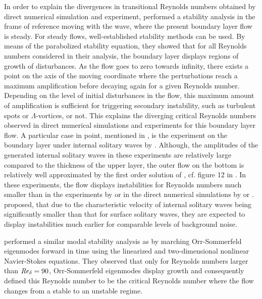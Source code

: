 \documentclass{jfm}
\newcommand\Rey{\mbox{\textit{Re}}}  %
\begin{document}
In order to 
explain the divergences in transitional Reynolds numbers obtained
by direct numerical simulation and experiment, 
\citet{VerschaevePedersen2014} 
performed a stability analysis in the frame of reference
moving with the wave, where the present boundary layer flow is steady. 
For steady flows,
well-established stability methods can be used. By means of the
parabolized stability equation, they showed that
for all Reynolds numbers considered in their analysis, the boundary
layer
displays regions of growth of disturbances. As the flow goes to
zero towards infinity, there exists a point
on the axis of the moving coordinate
where the perturbations reach a maximum amplification
before decaying again for a given Reynolds number. Depending
on the level of initial disturbances in the flow, 
this maximum amount of amplification is sufficient for triggering
secondary instability, such as turbulent spots or $ \Lambda $-vortices,
or not. This explains the diverging
critical Reynolds numbers observed in direct numerical
simulations and experiments for this boundary layer flow.
A particular case in point, mentioned in \cite{VerschaevePedersen2014},
is the experiment on the boundary layer under internal
solitary waves by \cite{CarrDavies2006}.
Although, the amplitudes of the generated internal
solitary waves in these experiments are relatively large
compared to the thickness of the upper layer, the outer
flow on the bottom is relatively well approximated by the
first order solution of \citet{Benjamin1966}, cf. figure 12 in \cite{CarrDavies2006}. 
In these
experiments, the flow displays instabilities for
Reynolds numbers much smaller than in the experiments
by \citet{SumerJensenSorensenFredsoeLiuCarstensen2010} 
or in the direct numerical simulations
by \citet{VittoriBlondeaux2008} 
or \citet{OzdemirHsuBalachandar2013}.
\citet{VerschaevePedersen2014} proposed, that due
to the characteristic velocity of internal solitary waves
being significantly smaller than that for surface solitary waves,
they are expected to display instabilities much earlier
for comparable levels of background noise.

\citet{SadekParrasDiamessisLiu2015} performed a similar
modal stability analysis as \citet{VerschaevePedersen2014}
by marching Orr-Sommerfeld eigenmodes forward in time using
the linearized and two-dimensional nonlinear Navier-Stokes equations. They
observed that only for Reynolds numbers larger than $ \Rey_\delta = 90 $,
Orr-Sommerfeld eigenmodes display growth and consequently defined this
Reynolds number to be the
critical Reynolds number where the flow changes from a stable to an unstable regime.\\
\end{document}
